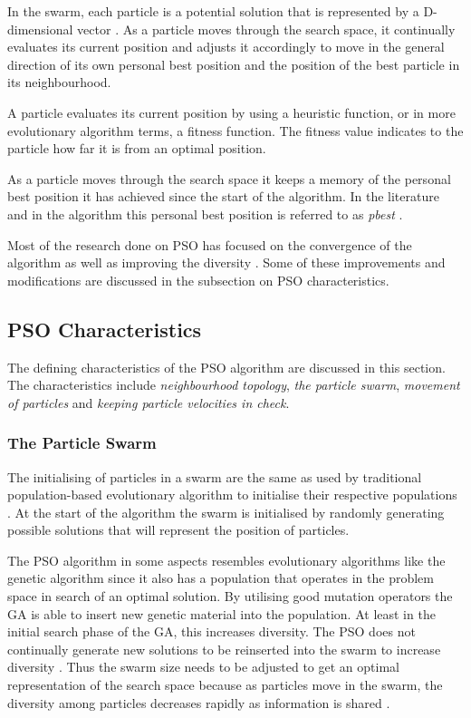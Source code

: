 In the swarm, each particle is a potential solution that is represented by a D-dimensional vector \cite{PSOHybridJobShop,PSOSelfHierarch}. As a particle moves through the search space, it continually evaluates its current position and adjusts it accordingly to move in the general direction of its own personal best position and the position of the best particle in its neighbourhood. 

A particle evaluates its current position by using a heuristic function, or in more evolutionary algorithm terms, a fitness function. The fitness value indicates to the particle how far it is from an optimal position\cite{CompuIntelligenceIntro}. 

As a particle moves through the search space it keeps a memory of the personal best position it has achieved since the start of the algorithm. In the literature and in the algorithm this personal best position is referred to as \emph{pbest} \cite{SOSwarm}.

Most of the research done on \gls{PSO} has focused on the convergence of the algorithm as well as improving the diversity \cite{FundamentalSwarm}. Some of these improvements and modifications are discussed in the subsection on \gls{PSO} characteristics.

\subsection{PSO Characteristics}
\label{sec:psocharacteristics}
The defining characteristics of the \gls{PSO} algorithm are discussed in this section. The characteristics include \emph{neighbourhood topology}, \emph{the particle swarm}, \emph{movement of particles} and \emph{keeping particle velocities in check}.
\subsubsection{The Particle Swarm}
The initialising of particles in a swarm are the same as used by traditional population-based evolutionary algorithm to initialise their respective populations \cite{FixedFAPPSO}.  At the start of the algorithm the swarm is initialised by randomly generating possible solutions that will represent the position of particles\cite{CompuIntelligenceIntro}. 

The \gls{PSO} algorithm in some aspects resembles evolutionary algorithms like the genetic algorithm since it also has a population that operates in the problem space in search of an optimal solution. By utilising good mutation operators the \gls{GA} is able to insert new genetic material into the population. At least in the initial search phase of the GA, this increases diversity\cite{CompuIntelligenceIntro}. The \gls{PSO} does not continually generate new solutions to be reinserted into the swarm to increase diversity \cite{PSOHybridUnitCommit}. Thus the swarm size needs to be adjusted to get an optimal representation of the search space because as particles move in the swarm, the diversity among particles decreases rapidly as information is shared \cite{FundamentalSwarm,CompuIntelligenceIntro}. 

